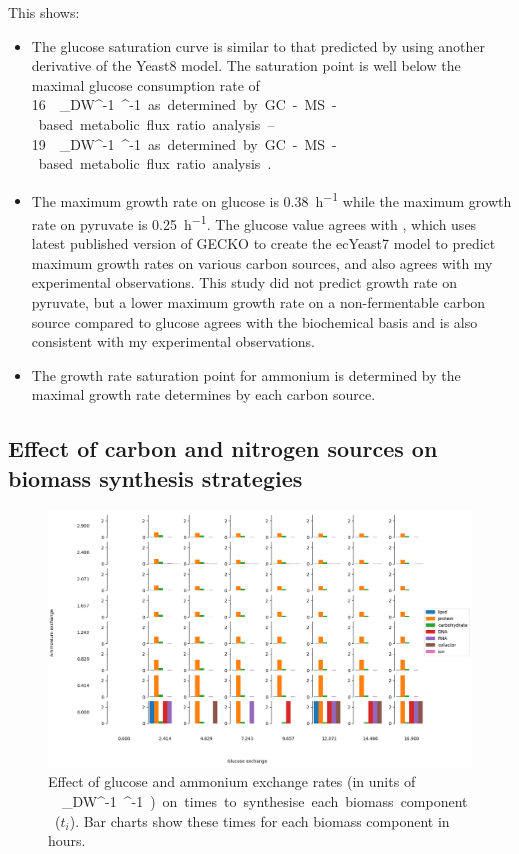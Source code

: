 This shows:
\begin{itemize}
  \item The glucose saturation curve is similar to that predicted by \textcite{elsemmanWholecellModelingYeast2022} using another derivative of the Yeast8 model.
        The saturation point is well below the maximal glucose consumption rate of \SIrange{16}{19}{\milli\mole~\gram_{DW}^{-1}~\hour^{-1}} as determined by GC-MS-based metabolic flux ratio analysis \parencite{blankTCACycleActivity2004}.
  \item The maximum growth rate on glucose is \SI{0.38}{\hour^{-1}} while the maximum growth rate on pyruvate is \SI{0.25}{\hour^{-1}}.
        The glucose value agrees with \textcite{domenzainReconstructionCatalogueGenomescale2022}, which uses latest published version of GECKO to create the ecYeast7 model to predict maximum growth rates on various carbon sources, and also agrees with my experimental observations.
        This study did not predict growth rate on pyruvate, but a lower maximum growth rate on a non-fermentable carbon source compared to glucose agrees with the biochemical basis and is also consistent with my experimental observations.
  \item The growth rate saturation point for ammonium is determined by the maximal growth rate determines by each carbon source.
\end{itemize}

\subsection{Effect of carbon and nitrogen sources on biomass synthesis strategies}
\label{subsec:model-grid}

\begin{figure}
  \centering
  \includegraphics[width=0.9\linewidth]{ablation_heatmap_01_barcharts_adapted}
  \caption{
    Effect of glucose and ammonium exchange rates (in units of \SI{}{\milli\mole~\gram_{DW}^{-1}~\hour^{-1}}) on times to synthesise each biomass component ($t_{i}$).
    Bar charts show these times for each biomass component in hours.
  }
  \label{fig:model-barchartgrid}
\end{figure}

